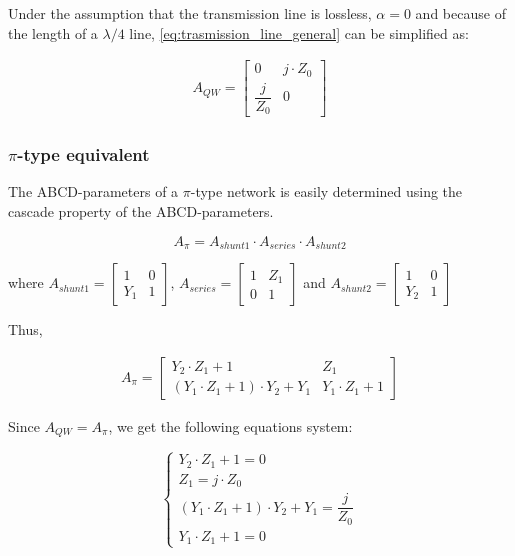 \noindent Under the assumption that the transmission line is lossless, $\alpha = 0$ and because of the length of a $\lambda/4$ line, \ref{eq:trasmission_line_general} can be simplified as:

\begin{gather}
  A_{QW} = 
\begin{bmatrix} 0 & j \cdot Z_0 \\ \dfrac{j}{Z_0}  & 0 \end{bmatrix}
 \label{eq:qw-line}
\end{gather}

\subsubsection{$\pi$-type equivalent}

\noindent The ABCD-parameters of a $\pi$-type network is easily determined using the cascade property of the ABCD-parameters.

\begin{equation}
A_{\pi} = A_{shunt1} \cdot A_{series} \cdot A_{shunt2}
\end{equation}

\noindent where $A_{shunt1} = \begin{bmatrix} 1 & 0  \\ Y_1 & 1 \end{bmatrix}$, $A_{series} = \begin{bmatrix} 1 & Z_1  \\ 0 & 1 \end{bmatrix}$ and $A_{shunt2} = \begin{bmatrix} 1 & 0  \\ Y_2 & 1 \end{bmatrix}$

\noindent Thus,

\begin{gather}
  A_{\pi} = 
 \begin{bmatrix} Y_2 \cdot Z_1 + 1 & Z_1 \\ (Y_1 \cdot Z_1 + 1) \cdot Y_2 + Y_1 & Y_1 \cdot Z_1 + 1 \end{bmatrix}
 \label{eq:pi-network-equivalent}
\end{gather}

\noindent Since $A_{QW} = A_{\pi}$, we get the following equations system:

\begin{equation}
\begin{cases} Y_2 \cdot Z_1 + 1 = 0\\ Z_1 = j\cdot Z_0 \\ (Y_1 \cdot Z_1 + 1) \cdot Y_2 + Y_1 = \dfrac{j}{Z_0} \\ Y_1 \cdot Z_1 + 1 = 0\end{cases} 
\end{equation}

